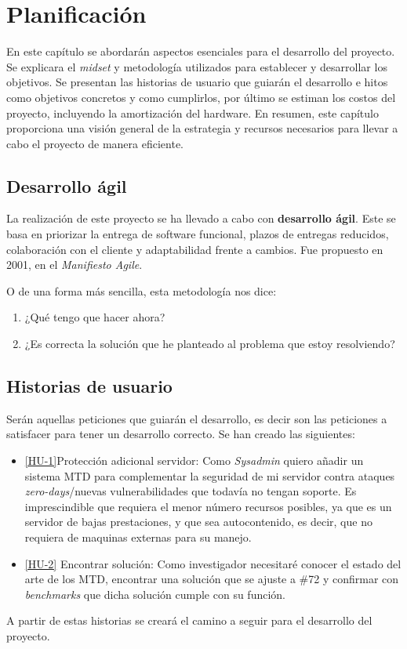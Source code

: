\chapter{Planificación}
En este capítulo se abordarán aspectos esenciales para el desarrollo del proyecto. Se explicara el \textit{midset} y metodología utilizados para establecer y desarrollar los objetivos. Se presentan las historias de usuario que guiarán el desarrollo e hitos como objetivos concretos y como cumplirlos, por último se estiman los costos del proyecto, incluyendo la amortización del hardware. En resumen, este capítulo proporciona una visión general de la estrategia y recursos necesarios para llevar a cabo el proyecto de manera eficiente.

\section{Desarrollo ágil}
La realización de este proyecto se ha llevado a cabo con \textbf{desarrollo ágil}. Este se basa en priorizar la entrega de software funcional, plazos de entregas reducidos, colaboración con el cliente y adaptabilidad frente a cambios. Fue propuesto en 2001, en el \textit{Manifiesto Agile}.\cite{agile}

O de una forma más sencilla, esta metodología nos dice:
\begin{enumerate}
    \item ¿Qué tengo que hacer ahora?
    \item ¿Es correcta la solución que he planteado al problema que estoy resolviendo?
\end{enumerate}

\section{Historias de usuario}
Serán aquellas peticiones que guiarán el desarrollo, es decir son las peticiones a satisfacer para tener un desarrollo correcto. Se han creado las siguientes:
\begin{itemize}
    \item \href{https://github.com/marcosrmartin/MTD_Server/issues/72}{[HU-1]}Protección adicional servidor: Como \textit{Sysadmin} quiero añadir un sistema MTD para complementar la seguridad de mi servidor contra ataques \textit{zero-days}/nuevas vulnerabilidades que todavía no tengan soporte. Es imprescindible que requiera el menor número recursos posibles, ya que es un servidor de bajas prestaciones, y que sea autocontenido, es decir, que no requiera de maquinas externas para su manejo.    
    \item \href{https://github.com/marcosrmartin/MTD_Server/issues/73}{[HU-2]} Encontrar solución: Como investigador necesitaré conocer el estado del arte de los MTD, encontrar una solución que se ajuste a \#72 y confirmar con \textit{benchmarks} que dicha solución cumple con su función.
\end{itemize}
A partir de estas historias se creará el camino a seguir para el desarrollo del proyecto.


